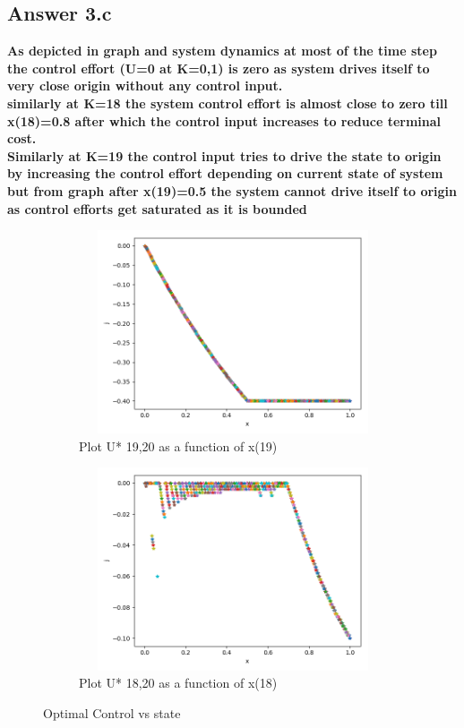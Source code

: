 \documentclass[12pt]{article}
\begin{document}
\subsection*{Answer 3.c}

{\bfseries
As depicted in graph and system dynamics at most of the time step the control effort (U=0 at K=0,1) is zero as system drives itself to very close origin without any control input.\\

similarly at K=18 the system control effort is almost close to zero till x(18)=0.8 after which the control input increases to reduce terminal cost.\\

Similarly at K=19 the control input tries to drive the state to origin by increasing the control effort depending on current state of system but from graph after x(19)=0.5 the system cannot drive itself to origin as control efforts get saturated as it is bounded\\  

}

\begin{figure}[H]
\begin{subfigure}{}
\centering
\includegraphics[width=10cm, height=6cm, centre]{3c19.png} 
\caption{Plot U* 19,20 as a function of x(19)}
\label{fig:subim1}
\end{subfigure}

\begin{subfigure}{}
\centering
\includegraphics[width=10cm, height=6cm, centre]{3c18.png} 
\caption{Plot U* 18,20 as a function of x(18)}
\label{fig:subim1}
\end{subfigure}

\caption{Optimal Control vs state}
\label{fig:image2}
\end{figure}
\end{document}
